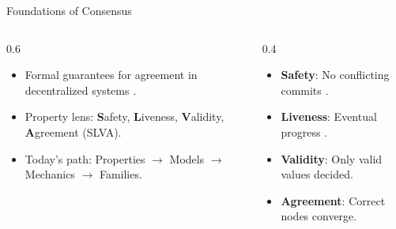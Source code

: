 \documentclass[aspectratio=169]{beamer}
\begin{document}
\begin{frame}{Foundations of Consensus}
\begin{columns}[T]
\begin{column}{0.6\linewidth}
    \begin{itemize}
        \item Formal guarantees for agreement in decentralized systems \cite{bano_blockchain_2017}.
        \item Property lens: \textbf{S}afety, \textbf{L}iveness, \textbf{V}alidity, \textbf{A}greement (SLVA).
        \item Today's path: Properties $\rightarrow$ Models $\rightarrow$ Mechanics $\rightarrow$ Families.
    \end{itemize}
    \vfill
    \begin{center}
    \end{center}
\end{column}
\begin{column}{0.4\linewidth}
    \begin{tcolorbox}[colback=white,colframe=black!20,title=SLVA at a Glance]
    \small
    \begin{itemize}
      \item \textbf{Safety}: No conflicting commits \cite{porat_consensus_2017}.
      \item \textbf{Liveness}: Eventual progress \cite{porat_consensus_2017}.
      \item \textbf{Validity}: Only valid values decided.
      \item \textbf{Agreement}: Correct nodes converge.
    \end{itemize}
    \end{tcolorbox}
\end{column}
\end{columns}
\end{frame}
\end{document}
